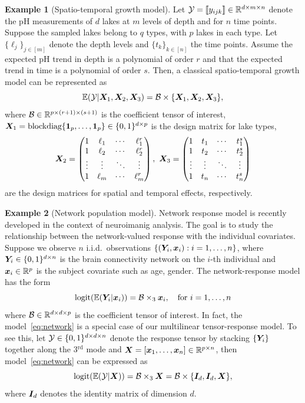 \documentclass[twoside]{article}
\theoremstyle{plain}
\theoremstyle{definition}
\newtheorem{example}{Example}
\begin{document}
\begin{example}[Spatio-temporal growth model]
Let $\mathcal{Y}=\llbracket y_{ijk} \rrbracket\in\mathbb{R}^{d \times m\times n}$ denote the pH measurements of $d$ lakes at $m$ levels of depth and for $n$ time points. Suppose the sampled lakes belong to $q$ types, with $p$ lakes in each type. Let $\{\ell_j\}_{j\in[m]}$ denote the depth levels and $\{t_k\}_{k\in[n]}$ the time points. Assume the expected pH trend in depth is a polynomial of order $r$ and that the expected trend in time is a polynomial of order $s$. Then, a classical spatio-temporal growth model can be represented as
\[
\mathbb{E}(\mathcal{Y}|\bm X_1,\bm X_2,\bm X_3)=\mathcal{B}\times\{\bm X_1,\bm X_2,\bm X_3\},
\]
where $\mathcal{B}\in\mathbb{R}^{p\times (r+1)\times (s+1)}$ is the coefficient tensor of interest, $\bm X_1=\text{blockdiag}\{\mathbf{1}_p,\ldots,\mathbf{1}_p\}\in \{0,1\}^{d\times p}$ is the design matrix for lake types, 
\[
\bm X_2=
\begin{pmatrix}
1 & \ell_1&\cdots &\ell^{r}_1\\
1 & \ell_2&\cdots &\ell^{r}_2\\
\vdots &\vdots&\ddots&\vdots\\
1&\ell_{m}&\cdots&\ell^{r}_{m}
\end{pmatrix},\
\bm X_3=
\begin{pmatrix}
1 & t_1&\cdots &t^{s}_1\\
1 & t_2&\cdots &t^{s}_2\\
\vdots &\vdots&\ddots&\vdots\\
1&t_{n}&\cdots&t^{s}_{n}
\end{pmatrix}
\]
are the design matrices for spatial and temporal effects, respectively. 
\end{example}
\begin{example}[Network population model] 
Network response model is recently developed in the context of neuroimanig analysis. The goal is to study the relationship between the network-valued response with the individual covariates. Suppose we observe $n$ i.i.d.\ observations $\{(\bm Y_i, \bm x_i): i=1,\ldots,n\}$, where $\bm Y_i\in\{0,1\}^{d\times n}$ is the brain connectivity network on the $i$-th individual and $\bm x_i\in\mathbb{R}^p$ is the subject covariate such as age, gender. The network-response model has the form
\begin{equation}\label{eq:network}
\text{logit}(\mathbb{E}(\bm Y_i|\bm x_i))=\mathcal{B}\times_3\bm x_i, \quad \text{for }i=1,\ldots,n
\end{equation}
where $\mathcal{B}\in \mathbb{R}^{d\times d\times p}$ is the coefficient tensor of interest. In fact, the model~\eqref{eq:network} is a special case of our multilinear tensor-response model. To see this, let $\mathcal{Y}\in\{0,1\}^{d\times d\times n}$ denote the response tensor by stacking $\{\bm Y_i\}$ together along the 3$^\text{rd}$ mode and $\bm X=[\bm x_1,\ldots,\bm x_n]\in\mathbb{R}^{p\times n}$, then model~\eqref{eq:network} can be expressed as 
\[
\text{logit}(\mathbb{E}(\mathcal{Y}|\bm X))=\mathcal{B}\times_3 \bm X=\mathcal{B}\times\{\bm I_d, \bm I_d, \bm X\},
\]
where $\bm I_d$ denotes the identity matrix of dimension $d$. 
 \end{example}
 
\end{document}
